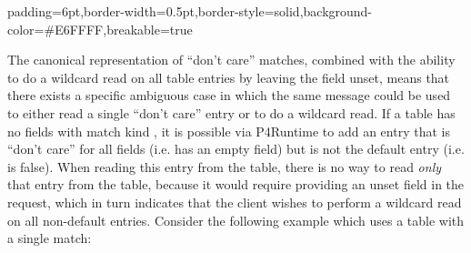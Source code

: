 \documentclass[11pt]{article}
\begin{document}
{%
\begin{mdbmargintb}{6pt}{6pt}%
\begin{mdblock}{padding=6pt,border-width=0.5pt,border-style=solid,background-color=\#E6FFFF,breakable=true}%
\begin{mdpre}%
\end{mdpre}%
\end{mdblock}%
\end{mdbmargintb}%

\noindent{}The canonical representation of \textquotedblleft{}don't care\textquotedblright{} matches, combined with the ability
to do a wildcard read on all table entries by leaving the  field unset,
means that there exists a specific ambiguous case in which the same message
could be used to either read a single \textquotedblleft{}don't care\textquotedblright{} entry or to do a wildcard
read. If a table has no fields with match kind , it is possible via
P4Runtime to add an entry that is \textquotedblleft{}don't care\textquotedblright{} for all fields (i.e. has an empty
 field) but is not the default entry (i.e.  is
false). When reading this entry from the table, there is no way to read \emph{only}
that entry from the table, because it would require providing an unset 
field in the request, which in turn indicates that the client wishes to perform
a wildcard read on all non-default entries. Consider the following example which
uses a table with a single  match:%

}
\end{document}
